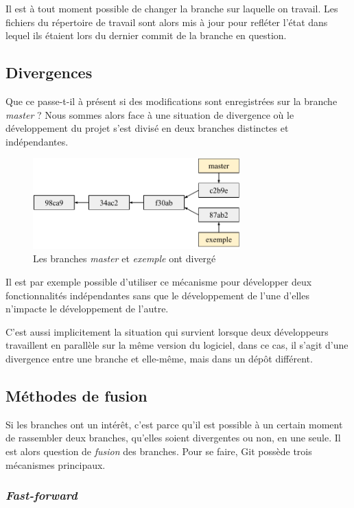 \documentclass[11pt,a4paper]{article}
\begin{document}
Il est à tout moment possible de changer la branche sur laquelle on travail. Les fichiers du répertoire de travail sont alors mis à jour pour refléter l'état dans lequel ils étaient lors du dernier commit de la branche en question.

\subsection{Divergences}

Que ce passe-t-il à présent si des modifications sont enregistrées sur la branche \textit{master} ? Nous sommes alors face à une situation de divergence où le développement du projet s'est divisé en deux branches distinctes et indépendantes.

\begin{figure}[h]
\begin{center}
\includegraphics[width=8cm]{img_divergence}
\caption{Les branches \textit{master} et \textit{exemple} ont divergé}
\end{center}
\end{figure}

Il est par exemple possible d'utiliser ce mécanisme pour développer deux fonctionnalités indépendantes sans que le développement de l'une d'elles n'impacte le développement de l'autre.

C'est aussi implicitement la situation qui survient lorsque deux développeurs travaillent en parallèle sur la même version du logiciel, dans ce cas, il s'agit d'une divergence entre une branche et elle-même, mais dans un dépôt différent.

\subsection{Méthodes de fusion}

Si les branches ont un intérêt, c'est parce qu'il est possible à un certain moment de rassembler deux branches, qu'elles soient divergentes ou non, en une seule. Il est alors question de \textit{fusion} des branches. Pour se faire, Git possède trois mécanismes principaux.

\subsubsection{\textit{Fast-forward}}
\end{document}
